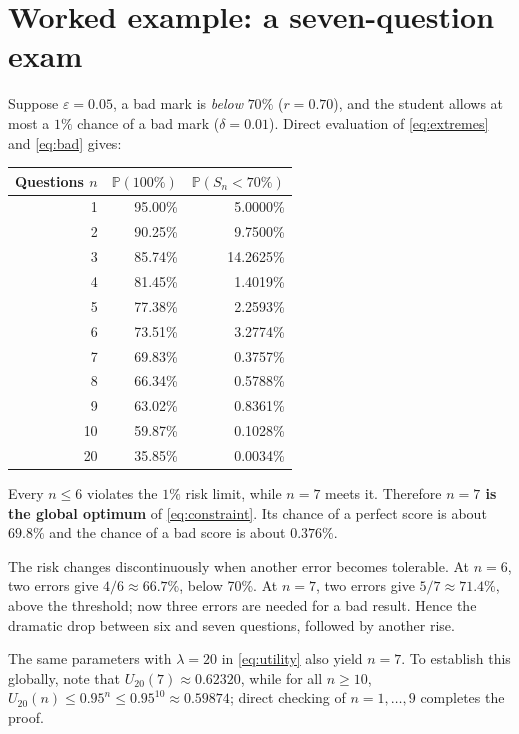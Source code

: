 \documentclass[11pt,a4paper]{article}
\newcommand{\Prb}{\mathbb P}
\begin{document}
\section{Worked example: a seven-question exam}
Suppose $\varepsilon=0.05$, a bad mark is \emph{below} $70\%$ ($r=0.70$), and the student allows at most a $1\%$ chance of a bad mark ($\delta=0.01$). Direct evaluation of \eqref{eq:extremes} and \eqref{eq:bad} gives:
\begin{center}
\begin{tabular}{@{}r r r@{}}
\toprule
Questions $n$ & $\Prb(100\%)$ & $\Prb(S_n<70\%)$\\
\midrule
1 & 95.00\% & 5.0000\%\\
2 & 90.25\% & 9.7500\%\\
3 & 85.74\% & 14.2625\%\\
4 & 81.45\% & 1.4019\%\\
5 & 77.38\% & 2.2593\%\\
6 & 73.51\% & 3.2774\%\\
\rowcolor{blue!7}7 & 69.83\% & 0.3757\%\\
8 & 66.34\% & 0.5788\%\\
9 & 63.02\% & 0.8361\%\\
10 & 59.87\% & 0.1028\%\\
20 & 35.85\% & 0.0034\%\\
\bottomrule
\end{tabular}
\end{center}
Every $n\leq6$ violates the $1\%$ risk limit, while $n=7$ meets it. Therefore \textbf{$n=7$ is the global optimum} of \eqref{eq:constraint}. Its chance of a perfect score is about $69.8\%$ and the chance of a bad score is about $0.376\%$.

The risk changes discontinuously when another error becomes tolerable. At $n=6$, two errors give $4/6\approx66.7\%$, below 70\%. At $n=7$, two errors give $5/7\approx71.4\%$, above the threshold; now three errors are needed for a bad result. Hence the dramatic drop between six and seven questions, followed by another rise.

The same parameters with $\lambda=20$ in \eqref{eq:utility} also yield $n=7$. To establish this globally, note that $U_{20}(7)\approx0.62320$, while for all $n\geq10$,
$U_{20}(n)\leq0.95^n\leq0.95^{10}\approx0.59874$; direct checking of $n=1,\ldots,9$ completes the proof.
\end{document}
